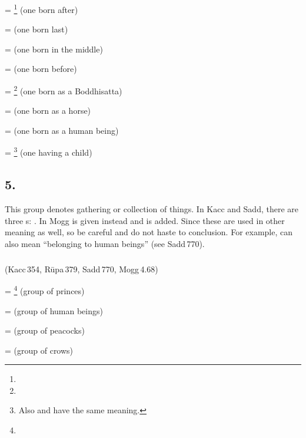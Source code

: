  = \footnote{} (one born after) \par
{} =  (one born last) \par
{} =  (one born in the middle) \par
{} =  (one born before) \par
{} = \footnote{} (one born as a Boddhisatta) \par
{} =  (one born as a horse) \par
{} =  (one born as a human being) \par
{} = \footnote{ Also  and  have the same meaning.} (one having a child) \par

\subsection*{5.\ }\label{tadgroup5}

This group denotes gathering or collection of things. In Kacc and Sadd, there are three s: . In Mogg  is given instead and  is added. Since these are used in other meaning as well, so be careful and do not haste to conclusion. For example,  can also mean ``belonging to human beings'' (see Sadd\,770).

\subparagraph*{} (Kacc\,354, R\=upa\,379, Sadd\,770, Mogg\,4.68)\label{pacct5:kadn}\label{pacct5:kadna}\label{pacct5:dna}

 = \footnote{} (group of princes) \par
{} =  (group of human beings) \par
{} =  (group of peacocks) \par
{} =  (group of crows) \par

